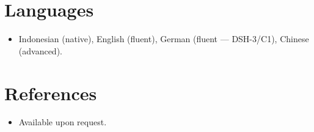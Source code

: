 \documentclass[11pt,a4paper,sans]{moderncv}
\begin{document}
\section{Languages}
\vspace{1pt}
\begin{itemize}
\item {Indonesian (native), English (fluent), German (fluent --- DSH-3/C1), Chinese (advanced).}
\end{itemize}


\section{References}
\vspace{1pt}
\begin{itemize}
\item{Available upon request.}
\end{itemize}
\end{document}
